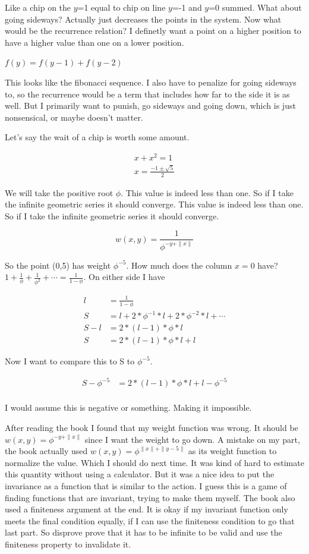 \documentclass[12pt,tikz,border=10pt]{article}
\theoremstyle{definition}
\theoremstyle{remark}
\begin{document}
Like a chip on the $y$=1 equal to chip on line $y$=-1 and $y$=0 summed. What about going sideways?
Actually just decreases the points in the system. Now what would be the recurrence relation? I definetly 
want a point on a higher position to have a higher value than one on a lower position.

$f(y)=f(y-1)+f(y-2)$

This looks like the fibonacci sequence.
I also have to penalize for going sideways to, so the recurrence would be a term that includes how far to the side it is as well. 
But I primarily want to punish, go sideways and going down, which is just nonsensical, or maybe doesn't matter.

Let's say the wait of a chip is worth some amount.

\begin{align*}
  x+x^2=1\\
  x=\frac{-1 \pm \sqrt{5}}{2}
\end{align*}

We will take the positive root $\phi$. This value is indeed less than one. So if I take the infinite geometric series it should converge.
 This value is indeed less than one. So if I take the infinite geometric series it should converge.

$$
w(x,y)=\frac{1}{\phi^{-y+\|x\|}}
$$

So the point (0,5) has weight $\phi^{-5}$. How much does the column $x=0$ have? $1+\frac{1}{\phi}+\frac{1}{\phi^2}+\cdots= \frac{1}{1-\phi}$.
On either side I have

\begin{align*}
  l&=\frac{1}{1-\phi}\\
  S&=l+2*\phi^{-1}*l+2*\phi^{-2}*l+\cdots\\
  S-l&=2*(l-1)*\phi*l\\
  S&=2*(l-1)*\phi * l+l
\end{align*}

Now I want to compare this to S to $\phi^{-5}$.

\begin{align*}
  S-\phi^{-5}&=2*(l-1)*\phi*l+l-\phi^{-5}\\
\end{align*}

I would assume this is negative or something.  Making it impossible.

After reading the book I found that my weight function was wrong. It should be $w(x,y)=\phi^{-y+\|x\|}$ since I want the weight to go down.
A mistake on my part, the book actually used $w(x,y)=\phi^{\|x\| + \|y-5\|}$ as its weight function to normalize the value. Which I should do next time.
It was kind of hard to estimate this quantity without using a calculator. But it was a nice idea to put the invariance as a function that is similar to the action.
I guess this is a game of finding functions that are invariant, trying to make them myself. The book also used a finiteness argument at the end. 
It is okay if my invariant function only meets the final condition equally, if I can use the finiteness condition to go that last part. So 
disprove prove that it has to be infinite to be valid and use the finiteness property to invalidate it.
\end{document}
